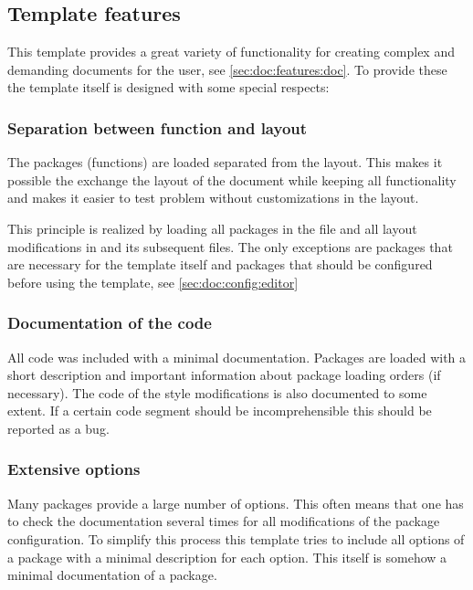 \subsection{Template features}
\label{sec:doc:features:template}
This template provides a great variety of functionality for creating complex and demanding documents for the user, see \cref{sec:doc:features:doc}. To provide these the template itself is designed with some special respects:

\subsubsection{Separation between function and layout}
\label{sec:doc:features:template:sep}
The packages (functions) are loaded separated from the layout. This makes it possible the exchange the layout of the document while keeping all functionality and makes it easier to test problem without customizations in the layout.

This principle is realized by loading all packages in the file  and all layout modifications in  and its subsequent files. The only exceptions are packages that are necessary for the template itself and packages that should be configured before using the template, see \cref{sec:doc:config:editor}
%
\subsubsection{Documentation of the code}
\label{sec:doc:features:template:doc(code)}
All code was included with a minimal documentation. Packages are loaded with a short description and important information about package loading orders (if necessary). The code of the style modifications is also documented to some extent. If a certain code segment should be incomprehensible this should be reported as a bug.

\subsubsection{Extensive options}
\label{sec:doc:features:template:options}
Many packages provide a large number of options. This often means that one has to check the documentation several times for all modifications of the package configuration. To simplify this process this template tries to include all options of a package with a minimal description for each option. This itself is somehow a minimal documentation of a package.

